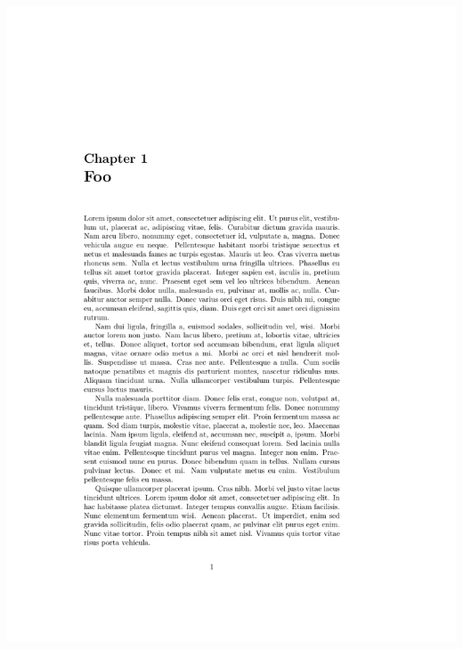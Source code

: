 \documentclass{beamer}
\begin{document}
\begin{frame}[fragile]
\begin{overprint}
\begin{columns}
      \begin{column}{0.5\textwidth}
        \begin{latexcode}
          \setlength\midchapskip{0pt}
        \end{latexcode}
        \begin{center}
          \includegraphics[frame,page=1,width=0.8\linewidth]{afterchapternum-2}
        \end{center}
      \end{column}
    \end{columns}


\end{overprint}
\end{frame}
\end{document}
